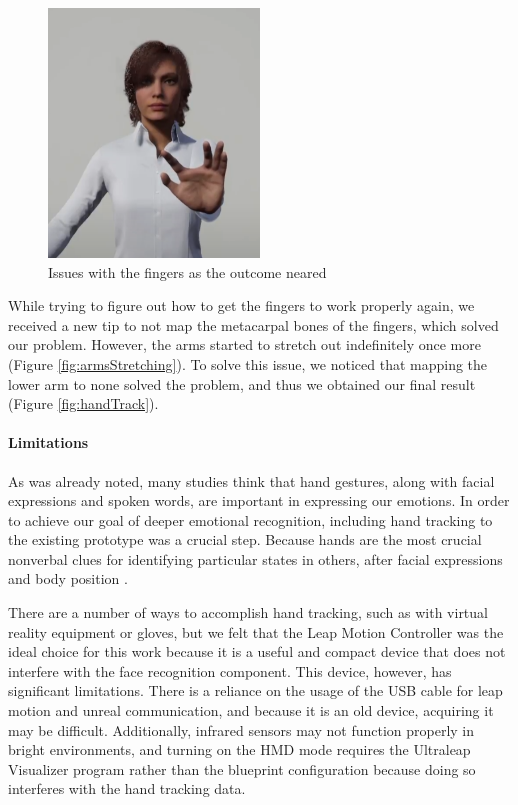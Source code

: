 \begin{figure}[!htb]
\includegraphics[width=0.5\textwidth]{figures/otherIssue.png}
\centering
\caption{Issues with the fingers as the outcome neared}
\label{fig:fingersIssue}
\end{figure}

While trying to figure out how to get the fingers to work properly again, we received a new tip to not map the metacarpal bones of the fingers, which solved our problem. However, the arms started to stretch out indefinitely once more (Figure \ref{fig:armsStretching}). To solve this issue, we noticed that mapping the lower arm to none solved the problem, and thus we obtained our final result (Figure \ref{fig:handTrack}).

\paragraph{Limitations}
As was already noted, many studies think that hand gestures, along with facial expressions and spoken words, are important in expressing our emotions. In order to achieve our goal of deeper emotional recognition, including hand tracking to the existing prototype was a crucial step. Because hands are the most crucial nonverbal clues for identifying particular states in others, after facial expressions and body position \cite{WAX97, REI22}.

There are a number of ways to accomplish hand tracking, such as with virtual reality equipment or gloves, but we felt that the Leap Motion Controller was the ideal choice for this work because it is a useful and compact device that does not interfere with the face recognition component. This device, however, has significant limitations. There is a reliance on the usage of the USB cable for leap motion and unreal communication, and because it is an old device, acquiring it may be difficult. Additionally, infrared sensors may not function properly in bright environments, and turning on the HMD mode requires the Ultraleap Visualizer program rather than the blueprint configuration because doing so interferes with the hand tracking data.

